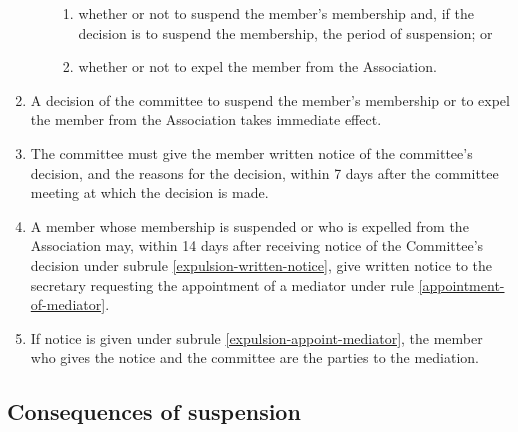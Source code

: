 \documentclass[../constitution.tex]{subfiles}
\begin{document}
\begin{enumerate}
\begin{enumerate}
\begin{enumerate}
                  \item whether or not to suspend the member's membership and, if the decision is to suspend the membership, the period of suspension; or
                  \item whether or not to expel the member from the Association.
                \end{enumerate}
        \end{enumerate}
  \item A decision of the committee to suspend the member's membership or to expel the member from the Association takes immediate effect.
  \item The committee must give the member written notice of the committee's decision, and the reasons for the decision, within 7 days after the committee meeting at which the decision is made. \label{expulsion-written-notice}
  \item A member whose membership is suspended or who is expelled from the Association may, within 14 days after receiving notice of the Committee's decision under subrule \ref{expulsion-written-notice}, give written notice to the secretary requesting the appointment of a mediator under rule \ref{appointment-of-mediator}. \label{expulsion-appoint-mediator}
  \item If notice is given under subrule \ref{expulsion-appoint-mediator}, the member who gives the notice and the committee are the parties to the mediation.
\end{enumerate}

\hypertarget{consequences-of-suspension}{%
  \subsection{Consequences of suspension}\label{consequences-of-suspension}}
\end{document}
